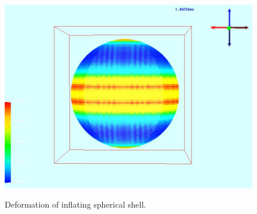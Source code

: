 \begin{figure}[htpb!]
\begin{center}
{                       \includegraphics{./Figs/shell_mpm/ss6.jpg}}
      \end{center}
      \caption{Deformation of inflating spherical shell.}
      \label{fig:sphShell}
    \end{figure}
